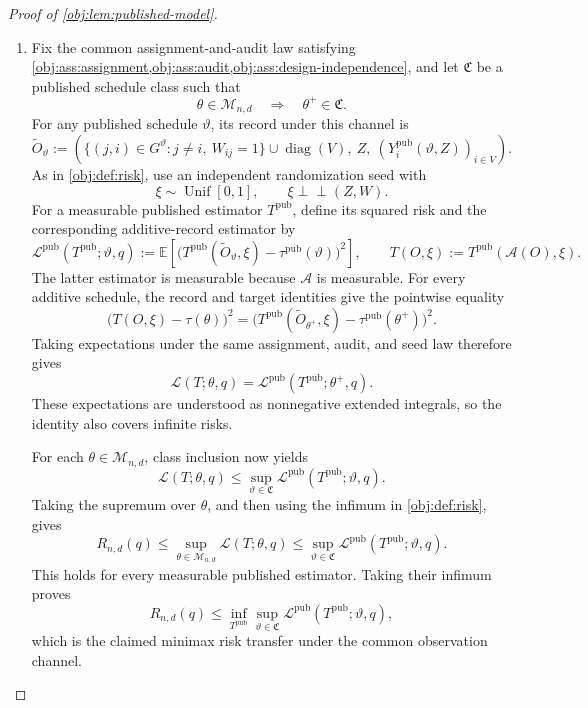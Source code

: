\documentclass[11pt]{article}
\begin{document}
\begin{proof}[Proof of \cref{obj:lem:published-model}]
\begin{enumerate}
\item Fix the common assignment-and-audit law satisfying
\cref{obj:ass:assignment,obj:ass:audit,obj:ass:design-independence},
and let \(\mathfrak C\) be a published schedule class such that
\[
\theta\in\mathcal M_{n,d}\quad\Longrightarrow\quad
\theta^+\in\mathfrak C.
\]
For any published schedule \(\vartheta\), its record under this channel is
\[
\widetilde O_\vartheta
:=
\left(
\{(j,i)\in G^\vartheta:j\ne i,\ W_{ij}=1\}
\cup\operatorname{diag}(V),
\ Z,\
(Y_i^{\mathrm{pub}}(\vartheta,Z))_{i\in V}
\right).
\]
As in \cref{obj:def:risk}, use an independent randomization seed with
\[
\xi\sim\operatorname{Unif}[0,1],
\qquad
\xi\mathbin{\perp\!\!\!\perp}(Z,W).
\]
For a measurable published estimator \(T^{\mathrm{pub}}\), define its squared risk and the corresponding additive-record estimator by
\[
\mathcal L^{\mathrm{pub}}(T^{\mathrm{pub}};\vartheta,q)
:=
\mathbb E\!\left[
\bigl(T^{\mathrm{pub}}(\widetilde O_\vartheta,\xi)
-\tau^{\mathrm{pub}}(\vartheta)\bigr)^2
\right],
\qquad
T(O,\xi):=T^{\mathrm{pub}}(\mathcal A(O),\xi).
\]
The latter estimator is measurable because \(\mathcal A\) is measurable. For every additive schedule, the record and target identities give the pointwise equality
\[
\bigl(T(O,\xi)-\tau(\theta)\bigr)^2
=
\bigl(T^{\mathrm{pub}}(\widetilde O_{\theta^+},\xi)
-\tau^{\mathrm{pub}}(\theta^+)\bigr)^2.
\]
Taking expectations under the same assignment, audit, and seed law therefore gives
\[
\mathcal L(T;\theta,q)
=
\mathcal L^{\mathrm{pub}}(T^{\mathrm{pub}};\theta^+,q).
\]
These expectations are understood as nonnegative extended integrals, so the identity also covers infinite risks.

For each \(\theta\in\mathcal M_{n,d}\), class inclusion now yields
\[
\mathcal L(T;\theta,q)
\le
\sup_{\vartheta\in\mathfrak C}
\mathcal L^{\mathrm{pub}}(T^{\mathrm{pub}};\vartheta,q).
\]
Taking the supremum over \(\theta\), and then using the infimum in
\cref{obj:def:risk}, gives
\[
R_{n,d}(q)
\le
\sup_{\theta\in\mathcal M_{n,d}}\mathcal L(T;\theta,q)
\le
\sup_{\vartheta\in\mathfrak C}
\mathcal L^{\mathrm{pub}}(T^{\mathrm{pub}};\vartheta,q).
\]
This holds for every measurable published estimator. Taking their infimum proves
\[
R_{n,d}(q)
\le
\inf_{T^{\mathrm{pub}}}
\sup_{\vartheta\in\mathfrak C}
\mathcal L^{\mathrm{pub}}(T^{\mathrm{pub}};\vartheta,q),
\]
which is the claimed minimax risk transfer under the common observation channel.
\end{enumerate}
\end{proof}
\end{document}
